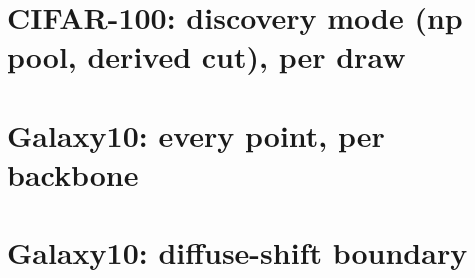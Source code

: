 \documentclass[10pt]{article}
\begin{document}
\section*{CIFAR-100: discovery mode (np pool, derived cut), per draw}




\clearpage
\section*{Galaxy10: every point, per backbone}


\clearpage


\clearpage


\clearpage
\section*{Galaxy10: diffuse-shift boundary}





\end{document}
